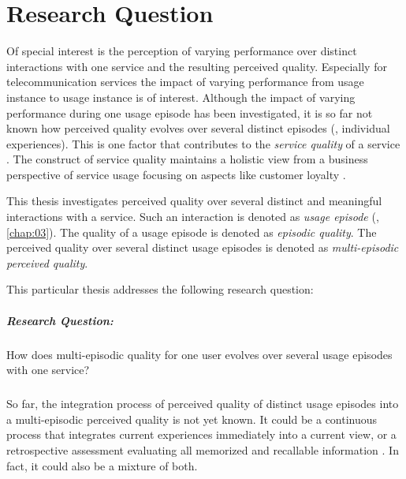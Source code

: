\section{Research Question}
Of special interest is the perception of varying performance over distinct interactions with one service and the resulting perceived quality.
Especially for telecommunication services the impact of varying performance from usage instance to usage instance is of interest.
Although the impact of varying performance during one usage episode has been investigated, it is so far not known how perceived quality evolves over several distinct episodes (\ie, individual experiences).
This is one factor that contributes to the \emph{service quality} of a service \citep[][]{berry_quality_1985, zeithaml_behavioral_1996}.
The construct of service quality maintains a holistic view from a business perspective of service usage focusing on aspects like customer loyalty \citep{parasuraman_conceptual_1985}.

This thesis investigates perceived quality over several distinct and meaningful interactions with a service.
Such an interaction is denoted as \emph{usage episode} (\cf, \autoref{chap:03}).
The quality of a usage episode is denoted as \emph{episodic quality}.
The perceived quality over several distinct usage episodes is denoted as \emph{multi-episodic perceived quality}.

This particular thesis addresses the following research question: 
\subparagraph*{Research Question:}
How does multi-episodic quality for one user evolves over several usage episodes with one service?

\subparagraph*{}
So far, the integration process of perceived quality of distinct usage episodes into a multi-episodic perceived quality is not yet known.
It could be a continuous process that integrates current experiences immediately into a current view, or a retrospective assessment evaluating all memorized and recallable information \citep[][]{hogarth_order_1992}. 
In fact, it could also be a mixture of both.

